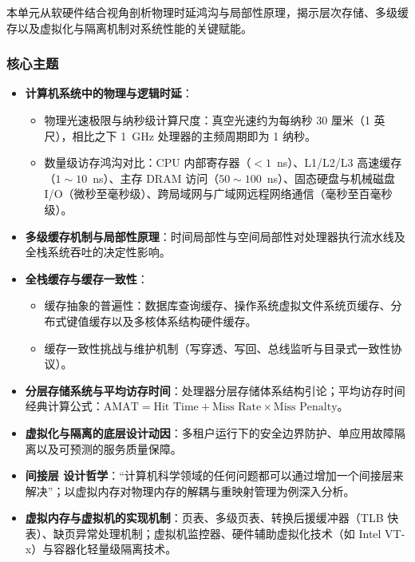 本单元从软硬件结合视角剖析物理时延鸿沟与局部性原理，揭示层次存储、多级缓存以及虚拟化与隔离机制对系统性能的关键赋能。

\subsubsection{核心主题}
\begin{itemize}
    \item \textbf{计算机系统中的物理与逻辑时延}：
    \begin{itemize}
        \item 物理光速极限与纳秒级计算尺度：真空光速约为每纳秒 30 厘米（1 英尺），相比之下 1~GHz 处理器的主频周期即为 1 纳秒。
        \item 数量级访存鸿沟对比：CPU 内部寄存器（$<1$~ns）、L1/L2/L3 高速缓存（$1\sim 10$~ns）、主存 DRAM 访问（$50\sim 100$~ns）、固态硬盘与机械磁盘 I/O（微秒至毫秒级）、跨局域网与广域网远程网络通信（毫秒至百毫秒级）。
    \end{itemize}
    \item \textbf{多级缓存机制与局部性原理}：时间局部性与空间局部性对处理器执行流水线及全栈系统吞吐的决定性影响。
    \item \textbf{全栈缓存与缓存一致性}：
    \begin{itemize}
        \item 缓存抽象的普遍性：数据库查询缓存、操作系统虚拟文件系统页缓存、分布式键值缓存以及多核体系结构硬件缓存。
        \item 缓存一致性挑战与维护机制（写穿透、写回、总线监听与目录式一致性协议）。
    \end{itemize}
    \item \textbf{分层存储系统与平均访存时间}：处理器分层存储体系结构引论；平均访存时间经典计算公式：$\text{AMAT} = \text{Hit Time} + \text{Miss Rate} \times \text{Miss Penalty}$。
    \item \textbf{虚拟化与隔离的底层设计动因}：多租户运行下的安全边界防护、单应用故障隔离以及可预测的服务质量保障。
    \item \textbf{间接层 设计哲学}：“计算机科学领域的任何问题都可以通过增加一个间接层来解决”；以虚拟内存对物理内存的解耦与重映射管理为例深入分析。
    \item \textbf{虚拟内存与虚拟机的实现机制}：页表、多级页表、转换后援缓冲器（TLB 快表）、缺页异常处理机制；虚拟机监控器、硬件辅助虚拟化技术（如 Intel VT-x）与容器化轻量级隔离技术。
\end{itemize}

